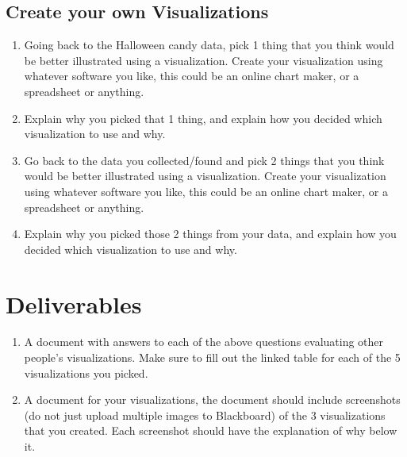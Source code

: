 \documentclass[12pt]{article}
\begin{document}
    \subsection*{Create your own Visualizations}
    \begin{enumerate}
        \item Going back to the Halloween candy data, pick 1 thing that you think would be better illustrated using a visualization.  Create your visualization using whatever software you like, this could be an online chart maker, or a spreadsheet or anything. 
        \item Explain why you picked that 1 thing, and explain how you decided which visualization to use and why.
        \item Go back to the data you collected/found and pick 2 things that you think would be better illustrated using a visualization. Create your visualization using whatever software you like, this could be an online chart maker, or a spreadsheet or anything. 
        \item Explain why you picked those 2 things from your data, and explain how you decided which visualization to use and why.
    \end{enumerate}

    \section*{Deliverables}
    \begin{sloppypar}
    \begin{enumerate}
        \item A document with answers to each of the above questions evaluating other people's visualizations. Make sure to fill out the linked table for each of the 5 visualizations you picked.
        \item A document for your visualizations, the document should include screenshots (do not just upload multiple images to Blackboard) of the 3 visualizations that you created. Each screenshot should have the explanation of why below it.
    \end{enumerate}
    \end{sloppypar}
\end{document}
